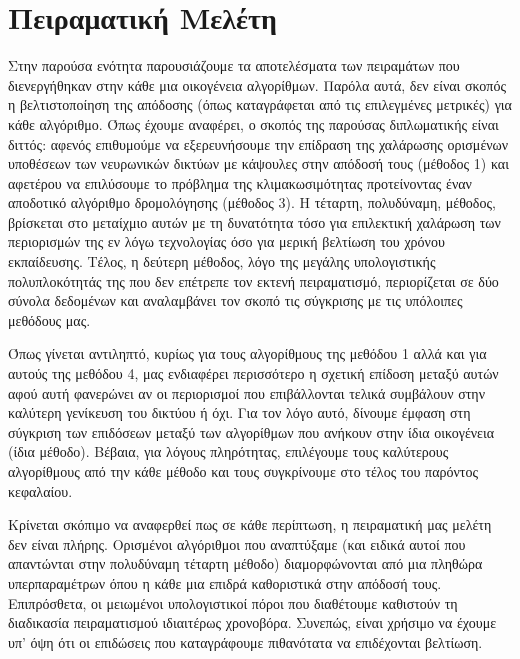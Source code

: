 \chapter{Πειραματική Μελέτη}

Στην παρούσα ενότητα παρουσιάζουμε τα αποτελέσματα των πειραμάτων που διενεργήθηκαν στην κάθε μια οικογένεια αλγορίθμων. Παρόλα αυτά, δεν είναι σκοπός η βελτιστοποίηση της απόδοσης (όπως καταγράφεται από τις επιλεγμένες μετρικές) για κάθε αλγόριθμο. Όπως έχουμε αναφέρει, ο σκοπός της παρούσας διπλωματικής είναι διττός: αφενός επιθυμούμε να εξερευνήσουμε την επίδραση της χαλάρωσης ορισμένων υποθέσεων των νευρωνικών δικτύων με κάψουλες στην απόδοσή τους (μέθοδος 1) και αφετέρου να επιλύσουμε το πρόβλημα της κλιμακωσιμότητας προτείνοντας έναν αποδοτικό αλγόριθμο δρομολόγησης (μέθοδος 3). Η τέταρτη, πολυδύναμη, μέθοδος, βρίσκεται στο μεταίχμιο αυτών με τη δυνατότητα τόσο για επιλεκτική χαλάρωση των περιορισμών της εν λόγω τεχνολογίας όσο για μερική βελτίωση του χρόνου εκπαίδευσης. Τέλος, η δεύτερη μέθοδος, λόγο της μεγάλης υπολογιστικής πολυπλοκότητάς της που δεν επέτρεπε τον εκτενή πειραματισμό, περιορίζεται σε δύο σύνολα δεδομένων και αναλαμβάνει τον σκοπό τις σύγκρισης με τις υπόλοιπες μεθόδους μας.\par

Όπως γίνεται αντιληπτό, κυρίως για τους αλγορίθμους της μεθόδου 1 αλλά και για αυτούς της μεθόδου 4, μας ενδιαφέρει περισσότερο η σχετική επίδοση μεταξύ αυτών αφού αυτή φανερώνει αν οι περιορισμοί που επιβάλλονται τελικά συμβάλουν στην καλύτερη γενίκευση του δικτύου ή όχι. Για τον λόγο αυτό, δίνουμε έμφαση στη σύγκριση των επιδόσεων μεταξύ των αλγορίθμων που ανήκουν στην ίδια οικογένεια (ίδια μέθοδο). Βέβαια, για λόγους πληρότητας, επιλέγουμε τους καλύτερους αλγορίθμους από την κάθε μέθοδο και τους συγκρίνουμε στο τέλος του παρόντος κεφαλαίου.\par

Κρίνεται σκόπιμο να αναφερθεί πως σε κάθε περίπτωση, η πειραματική μας μελέτη δεν είναι πλήρης. Ορισμένοι αλγόριθμοι που αναπτύξαμε (και ειδικά αυτοί που απαντώνται στην πολυδύναμη τέταρτη μέθοδο) διαμορφώνονται από μια πληθώρα υπερπαραμέτρων όπου η κάθε μια επιδρά καθοριστικά στην απόδοσή τους. Επιπρόσθετα, οι μειωμένοι υπολογιστικοί πόροι που διαθέτουμε καθιστούν τη διαδικασία πειραματισμού ιδιαιτέρως χρονοβόρα. Συνεπώς, είναι χρήσιμο να έχουμε υπ' όψη ότι οι επιδώσεις που καταγράφουμε πιθανότατα να επιδέχονται βελτίωση.\par

